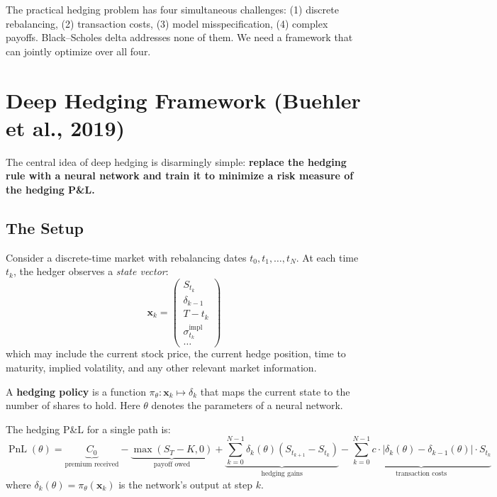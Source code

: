 \documentclass[11pt, a4paper]{article}
\theoremstyle{definition}
\theoremstyle{plain}
\theoremstyle{remark}
\newcommand{\PnL}{\operatorname{PnL}}
\begin{document}
\begin{keyresult}
The practical hedging problem has four simultaneous challenges:
(1) discrete rebalancing,
(2) transaction costs,
(3) model misspecification,
(4) complex payoffs.
Black--Scholes delta addresses none of them.
We need a framework that can jointly optimize over all four.
\end{keyresult}

\section{Deep Hedging Framework (Buehler et al., 2019)}
\label{sec:deep-hedging}

The central idea of deep hedging is disarmingly simple:
\textbf{replace the hedging rule with a neural network and train it to minimize
a risk measure of the hedging P\&L.}

\subsection{The Setup}

Consider a discrete-time market with rebalancing dates $t_0, t_1, \ldots, t_N$.
At each time $t_k$, the hedger observes a \emph{state vector}:
\[
    \bm{x}_k = \begin{pmatrix} S_{t_k} \\ \delta_{k-1} \\ T - t_k \\ \sigma_{t_k}^{\text{impl}} \\ \ldots \end{pmatrix}
\]
which may include the current stock price, the current hedge position, time to maturity,
implied volatility, and any other relevant market information.

A \textbf{hedging policy} is a function $\pi_\theta : \bm{x}_k \mapsto \delta_k$
that maps the current state to the number of shares to hold.
Here $\theta$ denotes the parameters of a neural network.

The hedging P\&L for a single path is:
\[
    \PnL(\theta) = \underbrace{C_0}_{\text{premium received}}
    - \underbrace{\max(S_T - K, 0)}_{\text{payoff owed}}
    + \underbrace{\sum_{k=0}^{N-1} \delta_k(\theta) \left(S_{t_{k+1}} - S_{t_k}\right)}_{\text{hedging gains}}
    - \underbrace{\sum_{k=0}^{N-1} c \cdot |\delta_k(\theta) - \delta_{k-1}(\theta)| \cdot S_{t_k}}_{\text{transaction costs}}
\]
where $\delta_k(\theta) = \pi_\theta(\bm{x}_k)$ is the network's output at step $k$.
\end{document}
